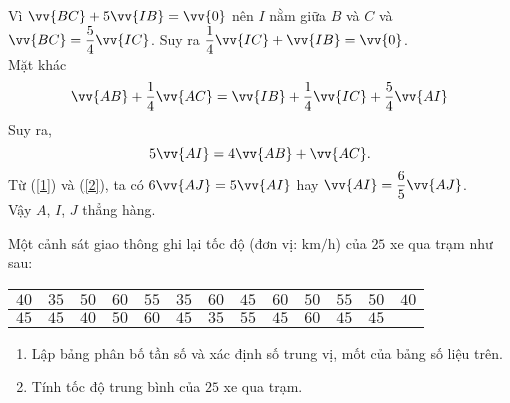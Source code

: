\begin{bt}
{\begin{enumerate}
			Vì $\vv{BC}+5\vv{IB}=\vv{0}$ nên $I$ nằm giữa $B$ và $C$ và $\vv{BC}=\dfrac{5}{4}\vv{IC}$. Suy ra $\dfrac{1}{4}\vv{IC}+\vv{IB}= \vv{0}$.\\
			Mặt khác
			\begin{equation*}
				\vv{AB}+\dfrac{1}{4}\vv{AC}=\vv{IB}+\dfrac{1}{4}\vv{IC}+\dfrac{5}{4}\vv{AI}
			\end{equation*}
			Suy ra,
			\begin{equation}\label{2}
				5\vv{AI} = 4\vv{AB}+\vv{AC}.
			\end{equation}
			Từ (\ref{1}) và (\ref{2}), ta có $6\vv{AJ}=5\vv{AI}$ hay $\vv{AI}=\dfrac{6}{5}\vv{AJ}$.\\
			Vậy $A$, $I$, $J$ thẳng hàng.
		\end{enumerate}
	}
\end{bt}

\begin{bt}%
	Một cảnh sát giao thông ghi lại tốc độ (đơn vị: $\mathrm{km} / \mathrm{h}$) của $25$ xe qua trạm như sau:
	\begin{center}
		\begin{tabular}{|l|l|l|l|l|l|l|l|l|l|l|l|l|}
			\hline
			$40$ & $35$ & $50$ & $60$ & $55$ & $35$ & $60$ & $45$ & $60$ & $50$ & $55$ & $50$ & $40$ \\
			\hline
			$45$ & $45$ & $40$ & $50$ & $60$ & $45$ & $35$ & $55$ & $45$ & $60$ & $45$ & $45$ &  \\
			\hline
		\end{tabular}
	\end{center}
	\begin{enumerate}
		\item Lập bảng phân bố tần số và xác định số trung vị, mốt của bảng số liệu trên.
		\item Tính tốc độ trung bình của $25$ xe qua trạm.
	\end{enumerate}
\end{bt}
